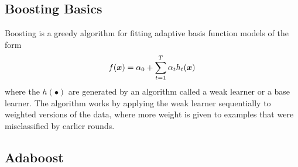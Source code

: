 \subsection{Boosting Basics}

Boosting is a greedy algorithm for fitting adaptive basis function models of the form
\begin{align*}
f(\boldsymbol{x})=\alpha_0+\sum_{t=1}^T\alpha_th_t(\boldsymbol{x})
\end{align*}
where the $h(\bullet)$ are generated by an algorithm called a weak learner or a base learner. The algorithm works by applying the weak learner sequentially to weighted versions of the data, where more weight is given to examples that were misclassified by earlier rounds.

\subsection{Adaboost}


